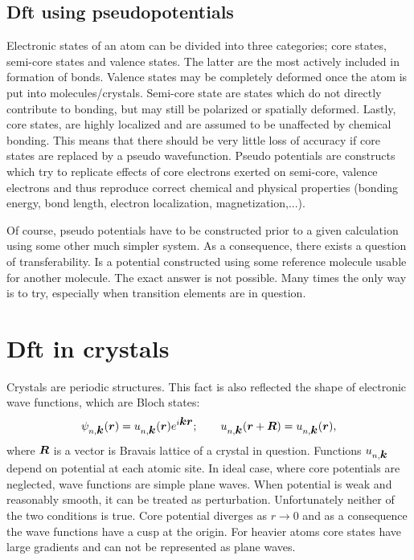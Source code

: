 \documentclass[openany, longbibliography,slovene,a4paper,12pt]{article}
\def\vec#1{\mbox{\boldmath$#1$}}
\begin{document}
\subsection{Dft using pseudopotentials}
Electronic states of an atom can be divided into three categories; core states,
semi-core states and valence states. The latter are the most actively included
in formation of bonds. Valence states may be completely deformed once the atom
is put into molecules/crystals. Semi-core state are states which do not
directly contribute to bonding, but may still be polarized or spatially
deformed. Lastly, core states, are highly localized and are assumed to be
unaffected by chemical bonding. This means that there should be very little loss
of accuracy if core states are replaced by a pseudo wavefunction.
Pseudo potentials are constructs which try to
replicate effects of core electrons exerted on semi-core, valence electrons and
thus reproduce correct chemical and physical properties (bonding energy, bond
length, electron localization, magnetization,...).

Of course, pseudo potentials have to be constructed prior to a given calculation using
some other much simpler system. As a consequence, there
exists a question of transferability. Is a potential constructed using some
reference molecule usable for another molecule. The exact answer is
not possible. Many times the only way is to try, especially when transition
elements are in question.


\section{Dft in crystals}
Crystals are periodic structures. This fact is also reflected the shape of
electronic  wave functions, which are Bloch states:
\begin{equation}
  \psi_{n, \vec k}(\vec r) = u_{n, \vec k}(\vec r)e^{i\vec k \vec r};\quad \textrm\quad u_{n,\vec k}(\vec r + \vec R) =  u_{n,\vec k}(\vec r),
\end{equation}
where $\vec R$ is a vector is Bravais lattice of a crystal in question.
Functions $u_{n,\vec k}$ depend on potential at each atomic site.
In ideal case, where core potentials are neglected,
wave functions are simple plane waves. When potential is weak and
reasonably smooth, it can be treated as perturbation. Unfortunately neither of
the two conditions is true. Core potential diverges as $r \rightarrow 0$
and as a consequence the wave functions have a cusp at the origin. For heavier
atoms core states have large gradients and can not be represented as plane waves.
\end{document}
